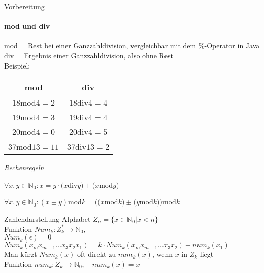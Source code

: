 \begin{frame}{Vorbereitung}
	\framesubtitle{mod und div}
	mod = Rest bei einer Ganzzahldivision, vergleichbar mit dem \%-Operator in Java\\
	div = Ergebnis einer Ganzzahldivision, also ohne Rest\\
	Beispiel:\\
	\center
	\begin{tabular}{c|c}
		\textbf{mod}   & \textbf{div}  \\
		\hline
		$18$mod$4=2$   & $18$div$4=4$  \\
		$19$mod$4=3$   & $19$div$4=4$  \\
		$20$mod$4=0$   & $20$div$4=5$  \\
		$37$mod$13=11$ & $37$div$13=2$ \\
	\end{tabular}
	\flushleft
	\emph{Rechenregeln}\\
	\small
	\centerline{$\forall x,y\in\mathbb{N}_{0}:x=y\cdot(x$div$y)+(x$mod$y)$}
	\centerline{$\forall x,y\in\mathbb{N}_{0}:(x\pm y)$mod$k=((x$mod$k)\pm(y$mod$k))$mod$k$}
	\normalsize
\end{frame}

\begin{frame}{Zahlendarstellung}
	Alphabet $Z_{n}=\{x\in\mathbb{N}_{0}\vert x<n\}$\\
	Funktion $Num_{k}: Z_{k}^{\ast}\longrightarrow\mathbb{N}_{0},$\\
	\small
	$Num_{k}(\epsilon)=0$\\
	$Num_{k}(x_{m}x_{m-1}\dots x_{3}x_{2}x_{1})=k\cdot Num_{k}(x_{m}x_{m-1}\dots x_{3}x_{2})+num_{k}(x_{1})$\\
	Man kürzt $Num_{k}(x)$ oft direkt zu $num_{k}(x)$, wenn $x$ in $Z_{k}$ liegt\\
	\normalsize
	Funktion $num_{k}: Z_{k}\longrightarrow\mathbb{N}_{0},$\small$\quad num_{k}(x)=x$\normalsize\\
\end{frame}

